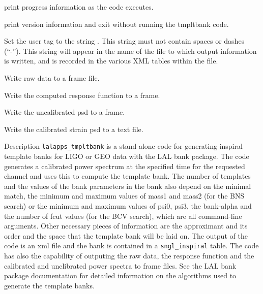 \begin{entry}
\item[\option{--verbose}] print progress information as the code executes.

\item[\option{--version}] print version information and exit without running 
the tmpltbank code. 

\item[\option{--user-tag} \parm{usertag}] 
Set the user tag to the string .  
This string must not contain spaces or dashes (``-'').  This string will appear 
in the name of the file to which output information is written, and is recorded 
in the various XML tables within the file.

\item[\option{--write-raw-data}] 
Write raw data to a frame file.

\item[\option{--write-response}] 
Write the computed response function to a frame.

\item[\option{--write-spectrum}] 
Write the uncalibrated psd to a frame.

\item[\option{--write-strain-spectrum}] 
Write the calibrated strain psd to a text file.

 


\item[Description]
\noindent \verb$lalapps_tmpltbank$ is a stand alone code for generating inspiral
template banks for LIGO or GEO data with the LAL bank package.  The code 
generates a calibrated power spectrum at the specified time for the 
requested channel and uses this to compute the template bank.  
The number of templates and the
values of the bank parameters in the bank also depend on the minimal
match, the
minimum and maximum values of mass1 and mass2 (for the BNS search) or the
minimum and maximum values of psi0, psi3, the bank-alpha and the number of
fcut values (for the BCV search), which are all command-line arguments.
Other necessary pieces of information are the approximant and its order and
the space that the template bank will be laid on. The output of the code is
an xml file and the bank is contained in a \verb$sngl_inspiral$ table. The code has
also the capability of outputing the raw data, the response function and the
calibrated and unclibrated power spectra to frame files.
See the LAL bank package
documentation for detailed information on the algorithms used to generate the
template banks.


\end{entry}
